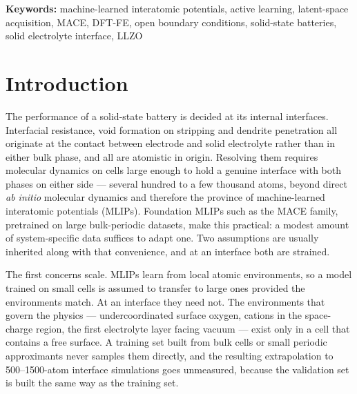 \documentclass[11pt]{article}
\begin{document}
\vspace{0.5em}
\noindent\textbf{Keywords:} machine-learned interatomic potentials, active
learning, latent-space acquisition, MACE, DFT-FE, open boundary conditions,
solid-state batteries, solid electrolyte interface, LLZO

\section{Introduction}

The performance of a solid-state battery is decided at its internal interfaces.
Interfacial resistance, void formation on stripping and dendrite penetration all
originate at the contact between electrode and solid electrolyte rather than in
either bulk phase, and all are atomistic in origin. Resolving them requires
molecular dynamics on cells large enough to hold a genuine interface with both
phases on either side --- several hundred to a few thousand atoms, beyond direct
\emph{ab initio} molecular dynamics and therefore the province of machine-learned
interatomic potentials (MLIPs). Foundation MLIPs such as the MACE family,
pretrained on large bulk-periodic datasets\citep{batatia2023mace,batatia2023foundation,omat24},
make this practical: a modest amount of system-specific data suffices to adapt
one. Two assumptions are usually inherited along with that convenience, and at an
interface both are strained.

The first concerns scale. MLIPs learn from local atomic environments, so a model
trained on small cells is assumed to transfer to large ones provided the
environments match. At an interface they need not. The environments that govern
the physics --- undercoordinated surface oxygen, cations in the space-charge
region, the first electrolyte layer facing vacuum --- exist only in a cell that
contains a free surface. A training set built from bulk cells or small periodic
approximants never samples them directly, and the resulting extrapolation to
500--1500-atom interface simulations goes unmeasured, because the validation set
is built the same way as the training set.
\end{document}

